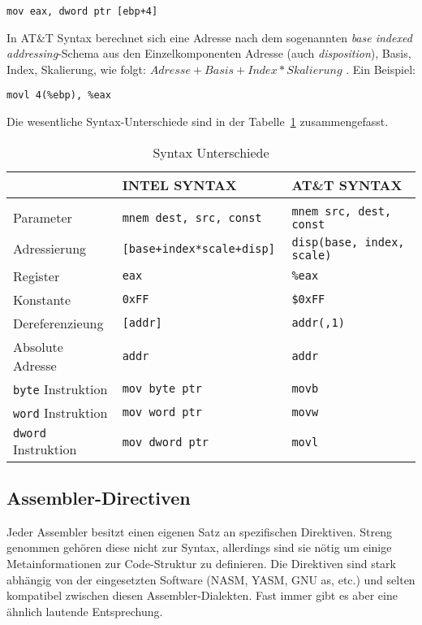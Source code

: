 \hspace{5mm} 
\texttt{mov eax, dword ptr [ebp+4]}

In AT\&T Syntax berechnet sich eine Adresse nach dem sogenannten \emph{base
indexed addressing}-Schema aus den Einzelkomponenten Adresse (auch
\emph{disposition}), Basis, Index, Skalierung, wie folgt: $Adresse + Basis +
Index*Skalierung$ . Ein Beispiel:

\hspace{5mm} 
\texttt{movl 4(\%ebp), \%eax}

Die wesentliche Syntax-Unterschiede sind in der Tabelle~\ref{tab:syntaxdiffs}
zusammengefasst.


\begin{table}[h]	%
\begin{tabular}{lll}
\\	                          & INTEL SYNTAX                  & AT\&T SYNTAX
\\\hline
\\	Parameter 								& \tt mnem dest, src, const  	  & \tt mnem src, dest, const
\\  Adressierung  				  	&	\tt [base+index*scale+disp]   & \tt disp(base, index, scale)
\\	Register      						& \tt eax              					& \tt \%eax
\\	Konstante     						& \tt 0xFF             					& \tt \$0xFF
\\	Dereferenzieung   				& \tt [addr]           					& \tt addr(,1)
\\	Absolute Adresse 			 	  & \tt addr             					& \tt *addr
\\	{\tt byte} Instruktion    & \tt mov byte ptr     					& \tt movb
\\	{\tt word} Instruktion    & \tt mov word ptr     					& \tt movw
\\  {\tt dword} Instruktion   & \tt mov dword ptr    					& \tt movl
\end{tabular}
\caption{Syntax Unterschiede} \label{tab:syntaxdiffs}
\end{table}

\subsection{Assembler-Directiven}
Jeder Assembler besitzt einen eigenen Satz an spezifischen Direktiven. Streng
genommen gehören diese nicht zur Syntax, allerdings sind sie nötig um einige
Metainformationen zur Code-Struktur zu definieren. Die Direktiven sind stark
abhängig von der eingesetzten Software (NASM, YASM, GNU as, etc.) und selten
kompatibel zwischen diesen Assembler-Dialekten. Fast immer gibt es aber eine
ähnlich lautende Entsprechung. 

